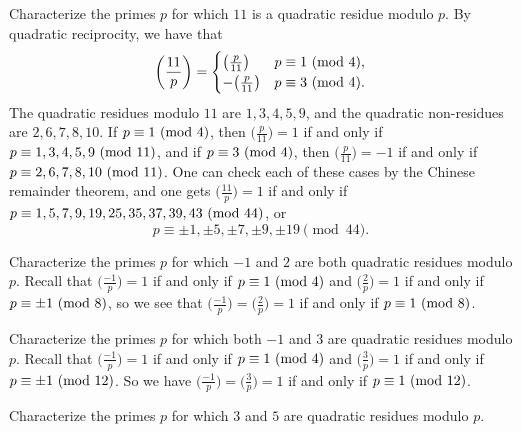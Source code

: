 \begin{example}
  Characterize the primes $p$ for
  which $11$ is a quadratic residue
  modulo $p$. By quadratic reciprocity,
  we have that
  \[
    \left(\frac{11}{p}\right)
    =
    \begin{cases}
      \big(\frac{p}{11}\big) & p \equiv 1 \ (\mathrm{mod}\ 4),\\
      -\big(\frac{p}{11}\big) & p \equiv 3 \ (\mathrm{mod}\ 4).
    \end{cases}
  \]
  The quadratic residues modulo $11$ are
  $1, 3, 4, 5, 9$, and the
  quadratic non-residues are
  $2, 6, 7, 8, 10$. If
  $p \equiv 1 \ (\mathrm{mod}\ 4)$, then
  $\big(\frac{p}{11}\big) = 1$
  if and only if $p \equiv 1, 3, 4, 5, 9 \ (\mathrm{mod}\ 11)$,
  and if $p \equiv 3 \ (\mathrm{mod}\ 4)$, then
  $\big(\frac{p}{11}\big) = -1$
  if and only if
  $p \equiv 2, 6, 7, 8, 10 \ (\mathrm{mod}\ 11)$.
  One can check each of these
  cases by the Chinese
  remainder theorem, and one gets
  $\big(\frac{11}{p}\big) = 1$
  if and only if
  $p \equiv 1, 5, 7, 9, 19, 25, 35, 37, 39, 43 \ (\mathrm{mod}\ 44)$, or
  \[
    p \equiv \pm 1, \pm 5, \pm 7, \pm 9, \pm 19 \pmod{44}.
  \]
\end{example}

\begin{example}
  Characterize the primes $p$ for which
  $-1$ and $2$ are both quadratic
  residues modulo $p$. Recall that
  $\big(\frac{-1}{p}\big) = 1$
  if and only if $p \equiv 1 \ (\mathrm{mod}\ 4)$
  and $\big(\frac{2}{p}\big) = 1$
  if and only if $p \equiv \pm 1 \ (\mathrm{mod}\ 8)$,
  so we see that
  $\big(\frac{-1}{p}\big) = \big(\frac{2}{p}\big) = 1$
  if and only if $p \equiv 1 \ (\mathrm{mod}\ 8)$.
\end{example}

\begin{example}
  Characterize the primes $p$ for which
  both $-1$ and $3$ are quadratic
  residues modulo $p$.
  Recall that $\big(\frac{-1}{p}\big) = 1$
  if and only if $p \equiv 1 \ (\mathrm{mod}\ 4)$
  and $\big(\frac{3}{p}\big) = 1$
  if and only if
  $p \equiv \pm 1 \ (\mathrm{mod}\ 12)$.
  So we have
  $\big(\frac{-1}{p}\big) = \big(\frac{3}{p}\big) = 1$
  if and only if $p \equiv 1 \ (\mathrm{mod}\ 12)$.
\end{example}

\begin{exercise}
  Characterize the primes $p$ for which
  $3$ and $5$ are quadratic residues
  modulo $p$.
\end{exercise}

